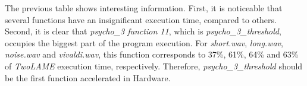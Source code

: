 \vspace{1cm}

The previous table shows interesting information. First, it is noticeable that several functions have an insignificant execution time, compared to others. Second, it is clear that \textit{psycho\_3 function 11}, which is \textit{psycho\_3\_threshold}, occupies the biggest part of the program execution. For \textit{short.wav}, \textit{long.wav}, \textit{noise.wav} and \textit{vivaldi.wav}, this function corresponds to 37\%, 61\%, 64\% and 63\% of \textit{TwoLAME} execution time, respectively.
Therefore, \textit{psycho\_3\_threshold} should be the first function accelerated in Hardware.


